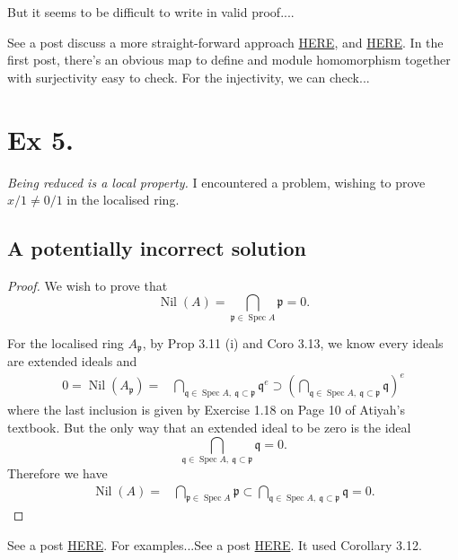 But it seems to be difficult to write in valid proof....

See a post discuss a more straight-forward approach \href{https://math.stackexchange.com/questions/375454/s-1b-and-t-1b-isomorphic-for-t-fs}{HERE}, and \href{https://math.stackexchange.com/questions/1459441/fa-to-b-ring-homomorphism-s-multiplicatively-closed-subset-of-a-what-does}{HERE}. In the first post, there's an obvious map to define and module homomorphism together with surjectivity easy to check. For the injectivity, we can check... 

\section{Ex 5.}
\textit{Being reduced is a local property.}
I encountered a problem, wishing to prove $x/1\neq 0/1$ in the localised ring.

\subsection{A potentially incorrect solution}
\begin{proof}
We wish to prove that 
$$\operatorname{Nil}(A)=\bigcap_{\mathfrak p\in\operatorname{Spec}A}\mathfrak p=0.$$

For the localised ring $A_{\mathfrak p}$, by Prop 3.11 (i) and Coro 3.13, we know every ideals are extended ideals and 
\begin{align*}
	0=\operatorname{Nil}(A_{\mathfrak p}) =& \bigcap_{\mathfrak q\in\operatorname{Spec}A,~ \mathfrak q\subset \mathfrak p} \mathfrak q^{e}\supset \left(\bigcap_{\mathfrak q\in\operatorname{Spec}A,~ \mathfrak q\subset \mathfrak p} \mathfrak q\right)^e
\end{align*}where the last inclusion is given by Exercise 1.18 on Page 10 of Atiyah's textbook. But the only way that an extended ideal to be zero is the ideal 
$$\bigcap_{\mathfrak q\in\operatorname{Spec}A,~ \mathfrak q\subset \mathfrak p} \mathfrak q=0.$$ Therefore we have 
\begin{align*}
	\operatorname{Nil}(A) =& \bigcap_{\mathfrak p\in\operatorname{Spec}A}\mathfrak p\subset \bigcap_{\mathfrak q\in\operatorname{Spec}A,~ \mathfrak q\subset \mathfrak p} \mathfrak q=0.
\end{align*}
\end{proof}
See a post \href{https://math.stackexchange.com/questions/2095939/proof-check-being-reduced-is-a-local-property-atiyah-macdonald-3-5?rq=1}{HERE}. For examples...See a post \href{https://math.stackexchange.com/questions/2095939/proof-check-being-reduced-is-a-local-property-atiyah-macdonald-3-5?rq=1}{HERE}. It used Corollary 3.12.

